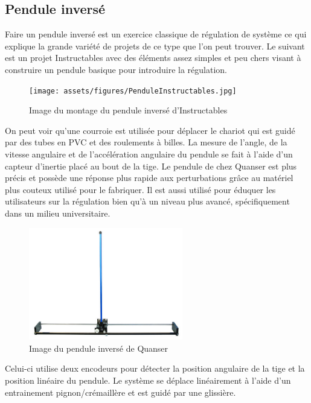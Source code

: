 \subsection{Pendule inversé}

Faire un pendule inversé est un exercice classique de régulation de système ce qui explique la grande variété de projets de ce type que l'on peut trouver.
Le suivant est un projet Instructables avec des éléments assez simples et peu chers visant à construire un pendule basique pour introduire la régulation.

\begin{figure}[H]
    \centering
    \texttt{[image: assets/figures/PenduleInstructables.jpg]}
    \caption{Image du montage du pendule inversé d'Instructables \cite{Instructables}}
    \label{fig:Instructables}
\end{figure}

On peut voir qu'une courroie est utilisée pour déplacer le chariot qui est guidé par des tubes en PVC et des roulements à billes. La mesure de l'angle, de la vitesse angulaire et de l'accélération angulaire du pendule se fait à l'aide d'un capteur d'inertie placé au bout de la tige.
Le pendule de chez Quanser est plus précis et possède une réponse plus rapide aux perturbations grâce au matériel plus couteux utilisé pour le fabriquer. Il est aussi utilisé pour éduquer les utilisateurs sur la régulation bien qu'à un niveau plus avancé, spécifiquement dans un milieu universitaire.

\begin{figure}[H]
    \centering
    \includegraphics[width = 0.6\textwidth]{assets/figures/PenduleQuanser.png}
    \caption{Image du pendule inversé de Quanser \cite{Quanser}}
    \label{fig:Quanser}
\end{figure}

Celui-ci utilise deux encodeurs pour détecter la position angulaire de la tige et la position linéaire du pendule. Le système se déplace linéairement à l'aide d'un entrainement pignon/crémaillère et est guidé par une glissière.